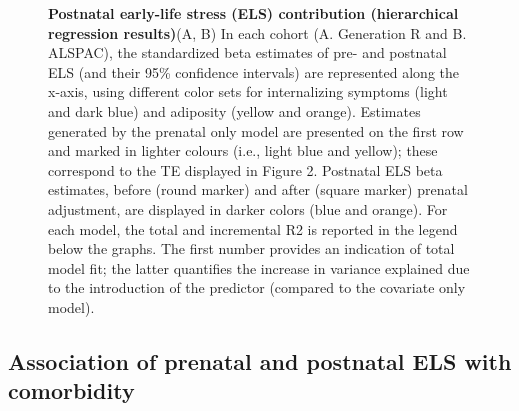 \documentclass[
  letterpaper,
  DIV=11,
  numbers=noendperiod]{scrreport}
\begin{document}
\begin{figure}[H]


\caption{\label{fig-2.3}\textbf{Postnatal early-life stress (ELS)
contribution (hierarchical regression results)}\newline(A, B) In each
cohort (A. Generation R and B. ALSPAC), the standardized beta estimates
of pre- and postnatal ELS (and their 95\% confidence intervals) are
represented along the x-axis, using different color sets for
internalizing symptoms (light and dark blue) and adiposity (yellow and
orange). Estimates generated by the prenatal only model are presented on
the first row and marked in lighter colours (i.e., light blue and
yellow); these correspond to the TE displayed in Figure 2. Postnatal ELS
beta estimates, before (round marker) and after (square marker) prenatal
adjustment, are displayed in darker colors (blue and orange). For each
model, the total and incremental R2 is reported in the legend below the
graphs. The first number provides an indication of total model fit; the
latter quantifies the increase in variance explained due to the
introduction of the predictor (compared to the covariate only model).}

\end{figure}%

\subsection{Association of prenatal and postnatal ELS with
comorbidity}\label{association-of-prenatal-and-postnatal-els-with-comorbidity-1}
\end{document}

